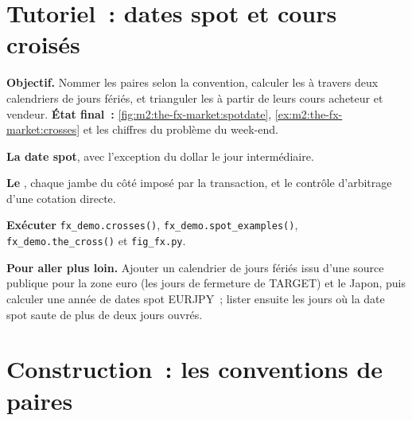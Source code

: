 \section{Tutoriel~: dates spot et cours croisés}\label{tut:m2:the-fx-market:pairs}

\begin{tutorial}
\textbf{Objectif.} Nommer les paires selon la convention, calculer les  à travers deux
calendriers de jours fériés, et trianguler les  à partir de leurs cours acheteur et vendeur.
\textbf{État final~:} \cref{fig:m2:the-fx-market:spotdate},
\cref{ex:m2:the-fx-market:crosses} et les chiffres du problème du week-end.
\begin{tutsteps}
\item \textbf{La date spot}, avec l'exception du dollar le jour
intermédiaire.
\label{lst:m2:the-fx-market:spot}
\item \textbf{Le }, chaque jambe du côté imposé par la transaction, et le
contrôle d'arbitrage d'une cotation directe.
\label{lst:m2:the-fx-market:cross}
\item \textbf{Exécuter} \texttt{fx\_demo.crosses()}, \texttt{fx\_demo.spot\_examples()},
\texttt{fx\_demo.the\_cross()} et \texttt{fig\_fx.py}.
\end{tutsteps}
\textbf{Pour aller plus loin.} Ajouter un calendrier de jours fériés issu d'une source publique pour
la zone euro (les jours de fermeture de TARGET) et le Japon, puis calculer une année
de dates spot EURJPY~; lister ensuite les jours où la date spot saute de plus de deux
jours ouvrés.
\end{tutorial}

\section{Construction~: les conventions de paires}\label{bld:m2:the-fx-market:fxpairs}

